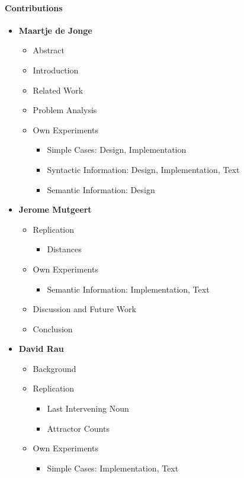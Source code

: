 \paragraph{Contributions}

\begin{itemize}
  \item \textbf{Maartje de Jonge}
  \begin{itemize}
    \item Abstract
    \item Introduction
    \item Related Work
    \item Problem Analysis
    \item Own Experiments
    \begin{itemize}
       \item Simple Cases: Design, Implementation
       \item Syntactic Information: Design, Implementation, Text
       \item Semantic Information: Design
    \end{itemize}        
  \end{itemize}

  \item \textbf{Jerome Mutgeert}
   \begin{itemize}
      \item Replication
      \begin{itemize}
         \item Distances
      \end{itemize}
    \item Own Experiments
    \begin{itemize}
       \item Semantic Information: Implementation, Text
    \end{itemize}        
    \item Discussion and Future Work
    \item Conclusion
   \end{itemize}

  \item \textbf{David Rau}
    \begin{itemize}
      \item Background
      \item Replication
      \begin{itemize}
         \item Last Intervening Noun
         \item Attractor Counts
      \end{itemize}
    \item Own Experiments
    \begin{itemize}
       \item Simple Cases: Implementation, Text
    \end{itemize}        
  \end{itemize}

\end{itemize}


